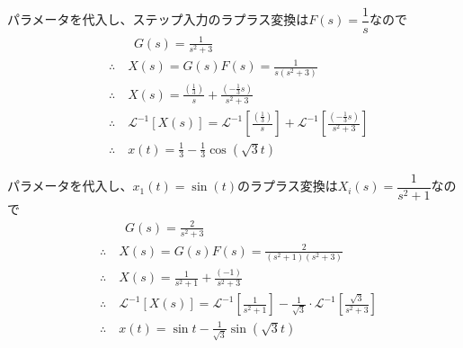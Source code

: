 \documentclass[a4paper,12pt]{article}
\begin{document}
\begin{tcolorbox}[title={6. (5)\(m=1,d=0,k_1=1,k_2=2\)とし、ステップ応答を求めよ。 
    }]
    パラメータを代入し、ステップ入力のラプラス変換は\(F(s)=\dfrac{1}{s}\)なので
    \vspace{-4mm}
    \begin{align*}
        &\qquad G(s) = \frac{1}{s^2 + 3} \\
        &\therefore \quad X(s) = G(s) F(s) = \frac{1}{s(s^2+3)} \\
        &\therefore \quad X(s) = \frac{\left(\frac{1}{3}\right)}{s}
        + \frac{\left(-\frac{1}{3}s\right)}{s^2+3} \\
        &\therefore \quad \mathcal{L}^{-1} \left[ X(s)\right] 
        = \mathcal{L}^{-1} \left[\frac{\left(\frac{1}{3}\right)}{s}\right] 
        + \mathcal{L}^{-1} \left[\frac{\left(-\frac{1}{3}s\right)}{s^2+3} \right] \\
        &\therefore \quad x(t) = \frac{1}{3} - \frac{1}{3}  \cos \left( \sqrt{3} t \right)
    \end{align*}

\end{tcolorbox}


\begin{tcolorbox}[title={6. (6)\(m=1,d=0,k_1=2,k_2=1\)とし、入力変位\(x_1(t)=\sin(t)\)を与えたときの応
\indent \quad 答を求めよ。 }]
パラメータを代入し、\(x_1(t)=\sin(t)\)のラプラス変換は\(X_i(s)=\dfrac{1}{s^2+1}\)なので
    \vspace{-4mm}
    \begin{align*}
        &\qquad G(s) = \frac{2}{s^2 +3} \\
        &\therefore \quad X(s) = G(s) F(s) = \frac{2}{(s^2 +1)(s^2+3)} \\
        &\therefore \quad X(s) =  \frac{1}{s^2 +1}
        + \frac{(-1)}{s^2+3}\\
        &\therefore \quad \mathcal{L}^{-1} \left[ X(s)\right] 
        = \mathcal{L}^{-1} \left[\frac{1}{s^2 +1} \right]
        - \frac{1}{\sqrt{3}} \cdot \mathcal{L}^{-1} \left[\frac{\sqrt{3}}{s^2+3} \right] \\
        &\therefore \quad x(t) = \sin t - \frac{1}{\sqrt{3}} \sin (\sqrt{3}t)
    \end{align*}
\end{tcolorbox}
\end{document}
